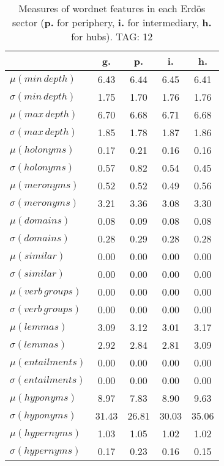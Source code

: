 \begin{table}[h!]
\begin{center}
\begin{tabular}{| l || c | c | c | c |}\hline
 & {\bf g.} & {\bf p.} & {\bf i.} & {\bf h.} \\\hline\hline
$\mu(min\,depth)$ & 6.43  & 6.44  & 6.45  & 6.41 \\
$\sigma(min\,depth)$ & 1.75  & 1.70  & 1.76  & 1.76 \\\hline
$\mu(max\,depth)$ & 6.70  & 6.68  & 6.71  & 6.68 \\
$\sigma(max\,depth)$ & 1.85  & 1.78  & 1.87  & 1.86 \\\hline
$\mu(holonyms)$ & 0.17  & 0.21  & 0.16  & 0.16 \\
$\sigma(holonyms)$ & 0.57  & 0.82  & 0.54  & 0.45 \\\hline
$\mu(meronyms)$ & 0.52  & 0.52  & 0.49  & 0.56 \\
$\sigma(meronyms)$ & 3.21  & 3.36  & 3.08  & 3.30 \\\hline
$\mu(domains)$ & 0.08  & 0.09  & 0.08  & 0.08 \\
$\sigma(domains)$ & 0.28  & 0.29  & 0.28  & 0.28 \\\hline
$\mu(similar)$ & 0.00  & 0.00  & 0.00  & 0.00 \\
$\sigma(similar)$ & 0.00  & 0.00  & 0.00  & 0.00 \\\hline
$\mu(verb\,groups)$ & 0.00  & 0.00  & 0.00  & 0.00 \\
$\sigma(verb\,groups)$ & 0.00  & 0.00  & 0.00  & 0.00 \\\hline
$\mu(lemmas)$ & 3.09  & 3.12  & 3.01  & 3.17 \\
$\sigma(lemmas)$ & 2.92  & 2.84  & 2.81  & 3.09 \\\hline
$\mu(entailments)$ & 0.00  & 0.00  & 0.00  & 0.00 \\
$\sigma(entailments)$ & 0.00  & 0.00  & 0.00  & 0.00 \\\hline
$\mu(hyponyms)$ & 8.97  & 7.83  & 8.90  & 9.63 \\
$\sigma(hyponyms)$ & 31.43  & 26.81  & 30.03  & 35.06 \\\hline
$\mu(hypernyms)$ & 1.03  & 1.05  & 1.02  & 1.02 \\
$\sigma(hypernyms)$ & 0.17  & 0.23  & 0.16  & 0.15 \\\hline
\end{tabular}
\caption{Measures of wordnet features in each Erd\"os sector ({{\bf p.}} for periphery, {{\bf i.}} for intermediary, {{\bf h.}} for hubs). TAG: 12}
\end{center}
\end{table}
